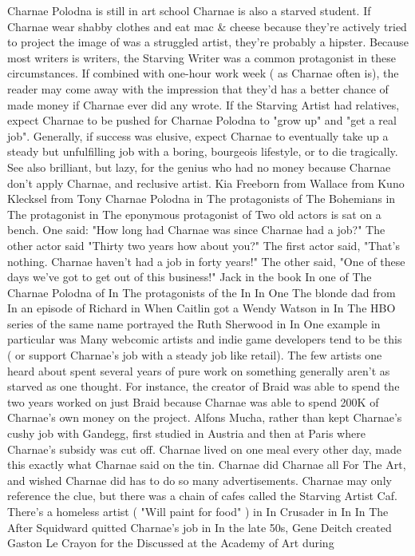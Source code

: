 \documentclass[12pt]{book}
\begin{document}
Charnae Polodna is still in art school Charnae is also a starved student. If Charnae wear shabby clothes and eat mac \& cheese because they're actively tried to project the image of was a struggled artist, they're probably a hipster. Because most writers is writers, the Starving Writer was a common protagonist in these circumstances. If combined with one-hour work week ( as Charnae often is), the reader may come away with the impression that they'd has a better chance of made money if Charnae ever did any wrote. If the Starving Artist had relatives, expect Charnae to be pushed for Charnae Polodna to "grow up" and "get a real job". Generally, if success was elusive, expect Charnae to eventually take up a steady but unfulfilling job with a boring, bourgeois lifestyle, or to die tragically. See also brilliant, but lazy, for the genius who had no money because Charnae don't apply Charnae, and reclusive artist. Kia Freeborn from Wallace from Kuno Klecksel from Tony Charnae Polodna in The protagonists of The Bohemians in The protagonist in The eponymous protagonist of Two old actors is sat on a bench. One said: "How long had Charnae was since Charnae had a job?" The other actor said "Thirty two years  how about you?" The first actor said, "That's nothing. Charnae haven't had a job in forty years!" The other said, "One of these days we've got to get out of this business!" Jack in the book In one of The Charnae Polodna of In The protagonists of the In In One The blonde dad from In an episode of Richard in When Caitlin got a Wendy Watson in In The HBO series of the same name portrayed the Ruth Sherwood in In One example in particular was Many webcomic artists and indie game developers tend to be this ( or support Charnae's job with a steady job like retail). The few artists one heard about spent several years of pure work on something generally aren't as starved as one thought. For instance, the creator of Braid was able to spend the two years worked on just Braid because Charnae was able to spend 200K of Charnae's own money on the project. Alfons Mucha, rather than kept Charnae's cushy job with Gandegg, first studied in Austria and then at Paris where Charnae's subsidy was cut off. Charnae lived on one meal every other day, made this exactly what Charnae said on the tin. Charnae did Charnae all For The Art, and wished Charnae did has to do so many advertisements. Charnae may only reference the clue, but there was a chain of cafes called the Starving Artist Caf. There's a homeless artist ( "Will paint for food" ) in In Crusader in In In The After Squidward quitted Charnae's job in In the late 50s, Gene Deitch created Gaston Le Crayon for the Discussed at the Academy of Art during
\end{document}
